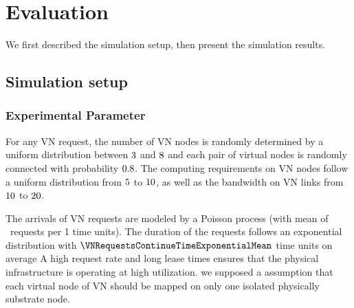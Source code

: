 
\section{Evaluation}
\label{sec:Evaluation}
We first described the simulation setup, then present the simulation results.

\subsection{Simulation setup}

\subsubsection{Experimental Parameter}
For any VN request, the number of VN nodes is randomly determined by a uniform distribution between $3$ and $8$ and each pair of virtual nodes is randomly connected with probability $0.8$. The computing requirements on VN nodes follow a uniform distribution from $5$ to $10$, as well as the bandwidth on VN links from $10$ to $20$.

The arrivals of VN requests are modeled by a Poisson process (with mean of \PossionMean \ requests per 1 time units).
The duration of the requests follows an exponential distribution with $\VNRequestsContinueTimeExponentialMean$ time units on average
A high request rate and long lease times ensures that the physical infrastructure is operating at high utilization. we supposed a assumption that each virtual node of VN should be mapped on only one isolated physically substrate node.

